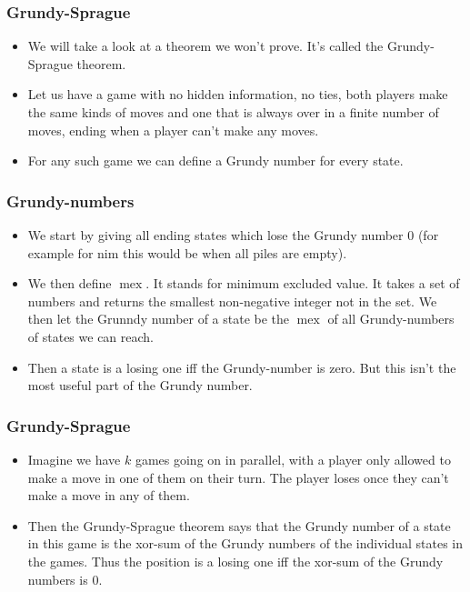 \documentclass{beamer}
\begin{document}
\begin{frame}[plain]
    \frametitle{Grundy-Sprague}

\begin{itemize}

\item We will take a look at a theorem we won't prove. It's called the Grundy-Sprague theorem.

\item Let us have a game with no hidden information, no ties, both players make the same kinds of moves and one that is always over in a finite number of moves, ending when a player can't make any moves.

\item For any such game we can define a Grundy number for every state.

\end{itemize}

\end{frame}

\begin{frame}[plain]
    \frametitle{Grundy-numbers}

\begin{itemize}

\item We start by giving all ending states which lose the Grundy number $0$ (for example for nim this would be when all piles are empty).

\item We then define $\operatorname{mex}$. It stands for minimum excluded value. It takes a set of numbers and returns the smallest non-negative integer not in the set. We then let the Grunndy number of a state be the $\operatorname{mex}$ of all Grundy-numbers of states we can reach.

\item Then a state is a losing one iff the Grundy-number is zero. But this isn't the most useful part of the Grundy number.

\end{itemize}

\end{frame}

\begin{frame}[plain]
\frametitle{Grundy-Sprague}

\begin{itemize}

\item Imagine we have $k$ games going on in parallel, with a player only allowed to make a move in one of them on their turn. The player loses once they can't make a move in any of them.

\item Then the Grundy-Sprague theorem says that the Grundy number of a state in this game is the xor-sum of the Grundy numbers of the individual states in the games. Thus the position is a losing one iff the xor-sum of the Grundy numbers is $0$.

\end{itemize}

\end{frame}
\end{document}
